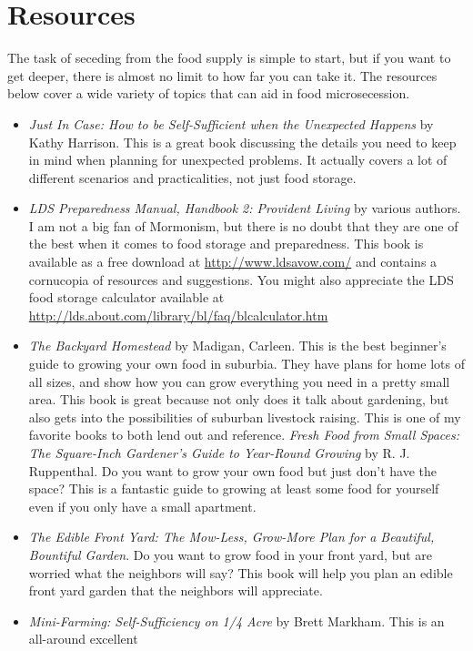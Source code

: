 \section{Resources}

The task of seceding from the food supply is simple to start, but if you
want to get deeper, there is almost no limit to how far you can take
it.  The resources below cover a wide variety of topics that can aid
in food microsecession.

\begin{itemize}
\item 
\textit{Just In Case: How to be Self-Sufficient when the Unexpected Happens} by Kathy Harrison.  
This is a great book discussing the details you need to keep in mind when planning for
unexpected problems.  It actually covers a lot of different scenarios and practicalities, 
not just food storage.
\item 
\textit{LDS Preparedness Manual, Handbook 2: Provident Living} by various authors.  I am
not a big fan of Mormonism, but there is no doubt that they are one of the best when it 
comes to food storage and preparedness.  This book is available as a free download at \url{http://www.ldsavow.com/}
and contains a cornucopia of resources and suggestions.  You might also appreciate the LDS
food storage calculator available at \url{http://lds.about.com/library/bl/faq/blcalculator.htm}
\item 
\textit{The Backyard Homestead} by Madigan, Carleen.  This is the best beginner's guide to 
growing your own food in suburbia.  They have plans for home lots of all sizes, and show
how you can grow everything you need in a pretty small area.  This book is great because
not only does it talk about gardening, but also gets into the possibilities of suburban 
livestock raising.  This is one of my favorite books to both lend out and reference.
\textit{Fresh Food from Small Spaces: The Square-Inch Gardener’s Guide to Year-Round Growing} by R. J. Ruppenthal. 
Do you want to grow your own food but just don't have the space?  This is a fantastic guide to
growing at least some food for yourself even if you only have a small apartment. 
\item 
\textit{The Edible Front Yard:  The Mow-Less, Grow-More Plan for a Beautiful, Bountiful Garden}.  Do you
want to grow food in your front yard, but are worried what the neighbors will say?  This book will help 
you plan an edible front yard garden that the neighbors will appreciate.
\item 
\textit{Mini-Farming: Self-Sufficiency on 1/4 Acre} by Brett Markham.  This is an all-around excellent

\end{itemize}
